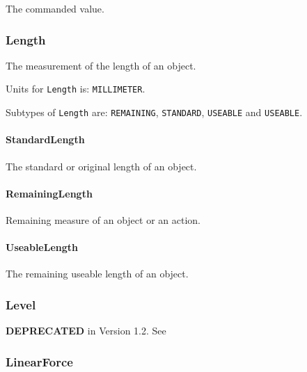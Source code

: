 The commanded value.


\subsubsection{Length}
\label{sec:Length}



The measurement of the length of an object.


Units for \texttt{Length} is: \texttt{MILLIMETER}.


Subtypes of \texttt{Length} are: \texttt{REMAINING}, \texttt{STANDARD}, \texttt{USEABLE} and \texttt{USEABLE}. 
\FloatBarrier

\paragraph{StandardLength}\mbox{}
\label{sec:StandardLength}



The standard or original length of an object.


\paragraph{RemainingLength}\mbox{}
\label{sec:RemainingLength}



Remaining measure of an object or an action.


\paragraph{UseableLength}\mbox{}
\label{sec:UseableLength}



The remaining useable length of an object.


\subsubsection{Level}
\label{sec:Level}



\textbf{DEPRECATED} in Version 1.2.  See 

\FloatBarrier

\subsubsection{LinearForce}
\label{sec:LinearForce}



